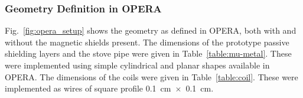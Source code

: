 





\subsubsection{Geometry Definition in OPERA}


Fig.~\ref{fig:opera_setup} shows the geometry as defined in OPERA,
both with and without the magnetic shields present.  The dimensions of
the prototype passive shielding layers and the stove pipe were given
in Table~\ref{table:mu-metal}.  These were implemented using simple
cylindrical and planar shapes available in OPERA.  The dimensions of
the coils were given in Table~\ref{table:coil}.  These were
implemented as wires of square profile 0.1~cm~$\times$~0.1~cm.

